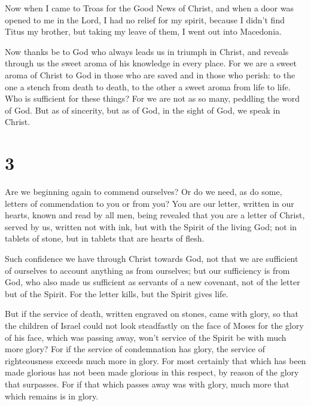  Now when I came to Troas for the Good News of Christ,
and when a door was opened to me in the Lord,  I had no
relief for my spirit, because I didn't find Titus my brother, but taking
my leave of them, I went out into Macedonia.

 Now thanks be to God who always leads us in triumph in
Christ, and reveals through us the sweet aroma of his knowledge in every
place.  For we are a sweet aroma of Christ to God in
those who are saved and in those who perish:  to the one
a stench from death to death, to the other a sweet aroma from life to
life. Who is sufficient for these things?  For we are not
as so many, peddling the word of God. But as of sincerity, but as of
God, in the sight of God, we speak in Christ.

\hypertarget{section-2}{%
\section{3}\label{section-2}}

 Are we beginning again to commend ourselves? Or do we
need, as do some, letters of commendation to you or from you?
 You are our letter, written in our hearts, known and read
by all men,  being revealed that you are a letter of
Christ, served by us, written not with ink, but with the Spirit of the
living God; not in tablets of stone, but in tablets that are hearts of
flesh.

 Such confidence we have through Christ towards God,
 not that we are sufficient of ourselves to account
anything as from ourselves; but our sufficiency is from God,
 who also made us sufficient as servants of a new
covenant, not of the letter but of the Spirit. For the letter kills, but
the Spirit gives life.

 But if the service of death, written engraved on stones,
came with glory, so that the children of Israel could not look
steadfastly on the face of Moses for the glory of his face, which was
passing away,  won't service of the Spirit be with much
more glory?  For if the service of condemnation has glory,
the service of righteousness exceeds much more in glory. 
For most certainly that which has been made glorious has not been made
glorious in this respect, by reason of the glory that surpasses.
 For if that which passes away was with glory, much more
that which remains is in glory.


